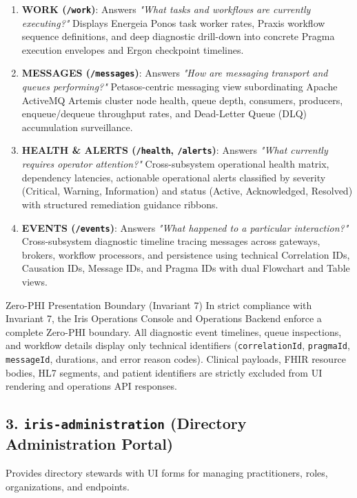 \begin{enumerate}
    \item \textbf{WORK (\texttt{/work})}: Answers \textit{"What tasks and workflows are currently executing?"} Displays Energeia Ponos task worker rates, Praxis workflow sequence definitions, and deep diagnostic drill-down into concrete Pragma execution envelopes and Ergon checkpoint timelines.
    \item \textbf{MESSAGES (\texttt{/messages})}: Answers \textit{"How are messaging transport and queues performing?"} Petasos-centric messaging view subordinating Apache ActiveMQ Artemis cluster node health, queue depth, consumers, producers, enqueue/dequeue throughput rates, and Dead-Letter Queue (DLQ) accumulation surveillance.
    \item \textbf{HEALTH \& ALERTS (\texttt{/health}, \texttt{/alerts})}: Answers \textit{"What currently requires operator attention?"} Cross-subsystem operational health matrix, dependency latencies, actionable operational alerts classified by severity (Critical, Warning, Information) and status (Active, Acknowledged, Resolved) with structured remediation guidance ribbons.
    \item \textbf{EVENTS (\texttt{/events})}: Answers \textit{"What happened to a particular interaction?"} Cross-subsystem diagnostic timeline tracing messages across gateways, brokers, workflow processors, and persistence using technical Correlation IDs, Causation IDs, Message IDs, and Pragma IDs with dual Flowchart and Table views.
\end{enumerate}

\begin{principlebox}{Zero-PHI Presentation Boundary (Invariant 7)}
In strict compliance with Invariant 7, the Iris Operations Console and Operations Backend enforce a complete Zero-PHI boundary. All diagnostic event timelines, queue inspections, and workflow details display only technical identifiers (\texttt{correlationId}, \texttt{pragmaId}, \texttt{messageId}, durations, and error reason codes). Clinical payloads, FHIR resource bodies, HL7 segments, and patient identifiers are strictly excluded from UI rendering and operations API responses.
\end{principlebox}

\subsection{3. \texttt{iris-administration} (Directory Administration Portal)}
Provides directory stewards with UI forms for managing practitioners, roles, organizations, and endpoints.

